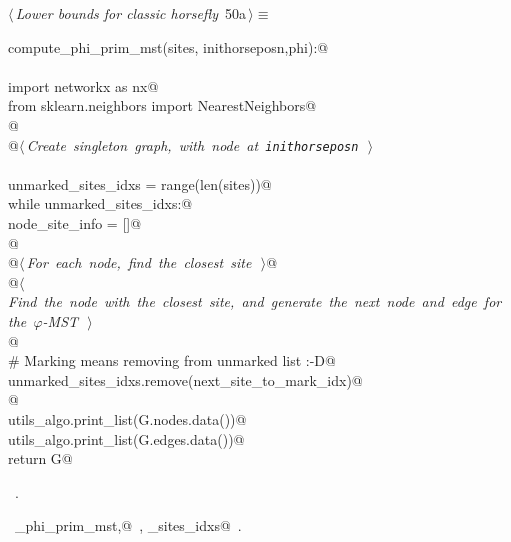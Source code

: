 \documentclass[11.5pt]{report}
\begin{document}
\begin{flushleft} \small\label{scrap73}\raggedright\small
{} $\langle\,${\itshape Lower bounds for classic horsefly}\nobreak\ {\footnotesize {50a}}$\,\rangle\equiv$
\vspace{-1ex}
\begin{list}{}{} \item
\mbox{}\verb@def compute_phi_prim_mst(sites, inithorseposn,phi):@\\
\mbox{}\verb@@\\
\mbox{}\verb@     import networkx as nx@\\
\mbox{}\verb@     from sklearn.neighbors import NearestNeighbors@\\
\mbox{}\verb@     @\\
\mbox{}\verb@     @\hbox{$\langle\,${\itshape Create singleton graph, with node at \verb|inithorseposn|}\nobreak\ {\footnotesize {}}$\,\rangle$}\verb@@\\
\mbox{}\verb@@\\
\mbox{}\verb@     unmarked_sites_idxs = range(len(sites))@\\
\mbox{}\verb@     while unmarked_sites_idxs:@\\
\mbox{}\verb@          node_site_info = []@\\
\mbox{}\verb@          @\\
\mbox{}\verb@          @\hbox{$\langle\,${\itshape For each node, find the closest site}\nobreak\ {\footnotesize {}}$\,\rangle$}\verb@    @\\
\mbox{}\verb@          @\hbox{$\langle\,${\itshape Find the node with the closest site, and generate the next node and edge for the $\varphi$-MST}\nobreak\ {\footnotesize {}}$\,\rangle$}\verb@@\\
\mbox{}\verb@          @\\
\mbox{}\verb@          # Marking means removing from unmarked list :-D@\\
\mbox{}\verb@          unmarked_sites_idxs.remove(next_site_to_mark_idx)@\\
\mbox{}\verb@          @\\
\mbox{}\verb@     utils_algo.print_list(G.nodes.data())@\\
\mbox{}\verb@     utils_algo.print_list(G.edges.data())@\\
\mbox{}\verb@     return G@\\
\mbox{}\verb@@{\NWsep}
\end{list}
\vspace{-1.5ex}
\footnotesize
\begin{list}{}{\setlength{\itemsep}{-\parsep}\setlength{\itemindent}{-\leftmargin}}
\item \NWtxtMacroRefIn\ .
\item \NWtxtIdentsDefed\nobreak\  \verb@compute_phi_prim_mst,@\nobreak\ \NWtxtIdentsNotUsed, \verb@unmarked_sites_idxs@\nobreak\ .
\item{}
\end{list}
\vspace{4ex}
\end{flushleft}
\end{document}
